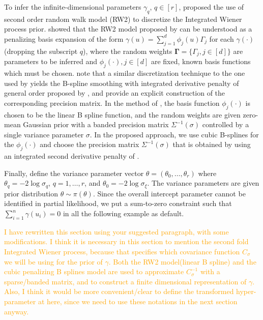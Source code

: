 \documentclass[ba]{imsart}
\newcommand{\ziang}[1]{\textcolor{orange}{{ }#1}}
\begin{document}
To infer the infinite-dimensional parameters $\gamma_q$, $q \in [r]$, \cite{rw2} proposed the use of second order random walk model (RW2) to discretize the Integrated Wiener process prior. \cite{SPDEandPspline} showed that the RW2 model proposed by \cite{rw2} can be understood as a penalizing basis expansion of the form $\gamma(u) = \sum_{j=1}^{d}\phi_{j}(u)\Gamma_{j}$ for each $\gamma(\cdot)$ (dropping the subscript $q$), where the random weights $\boldsymbol{\Gamma} = \{\Gamma_{j},j\in[d]\}$ are parameters to be inferred and $\phi_{j}(\cdot),j\in[d]$ are fixed, known basis functions which must be chosen. 
\cite{adaptivesmoothingsplines} note that a similar discretization technique to the one used by \cite{rw2} yields the B-spline smoothing with integrated derivative penalty of general order proposed by \cite{osullivanspline}, and \cite{derivativepenalties} provide an explicit construction of the corresponding precision matrix.
In the method of \cite{rw2}, the basis function $\phi_{j}(\cdot)$ is chosen to be the linear B spline function, and the random weights are given zero-mean Gaussian prior with a banded precision matrix $\Sigma^{-1}(\sigma)$ controlled by a single variance parameter $\sigma$.
In the proposed approach, we use cubic B-splines for the $\phi_{j}(\cdot)$ and choose the precision matrix $\Sigma^{-1}(\sigma)$ that is obtained by using an integrated second derivative penalty of \cite{derivativepenalties}.

Finally, define the variance parameter vector $\theta = (\theta_{0},\ldots,\theta_{r})$ where $\theta_{q} = -2\log\sigma_{q}$, $q = 1,\ldots,r$, and $\theta_{0} = -2\log\sigma_{\xi}$. The variance parameters are given prior distribution $\theta \sim \pi(\theta)$. Since the overall intercept parameter cannot be identified in partial likelihood, we put a sum-to-zero constraint such that $\sum_{i=1}^{n} \gamma{(u_i)} = 0$ in all the following example as default.

\ziang{I have rewritten this section using your suggested paragraph, with some modifications. I think it is necessary in this section to mention the second fold Integrated Wiener process, because that specifies which covariance function $C_\sigma$ we will be using for the prior of $\gamma$. Both the RW2 model(linear B spline) and the cubic penalizing B splines model are used to approximate $C^{-1}_\sigma$ with a sparse/banded matrix, and to construct a finite dimensional representation of $\gamma$. Also, I think it would be more convenient/clear to define the transformed hyper-parameter at here, since we need to use these notations in the next section anyway.}
\end{document}
